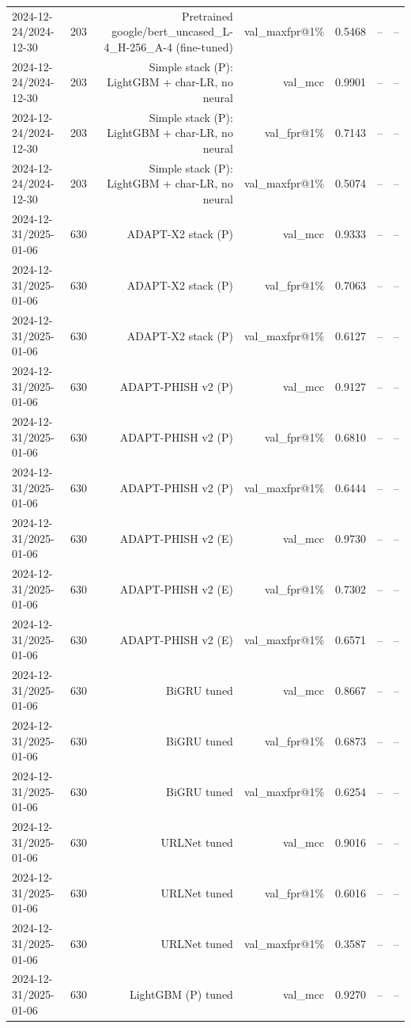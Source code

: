 \begin{table}[t]
\begin{tabular}{llrrrrr}
2024-12-24/2024-12-30 & 203 & Pretrained google/bert\_uncased\_L-4\_H-256\_A-4 (fine-tuned) & val\_maxfpr@1\% & 0.5468 & -- & -- \\
2024-12-24/2024-12-30 & 203 & Simple stack (P): LightGBM + char-LR, no neural & val\_mcc & 0.9901 & -- & -- \\
2024-12-24/2024-12-30 & 203 & Simple stack (P): LightGBM + char-LR, no neural & val\_fpr@1\% & 0.7143 & -- & -- \\
2024-12-24/2024-12-30 & 203 & Simple stack (P): LightGBM + char-LR, no neural & val\_maxfpr@1\% & 0.5074 & -- & -- \\
2024-12-31/2025-01-06 & 630 & ADAPT-X2 stack (P) & val\_mcc & 0.9333 & -- & -- \\
2024-12-31/2025-01-06 & 630 & ADAPT-X2 stack (P) & val\_fpr@1\% & 0.7063 & -- & -- \\
2024-12-31/2025-01-06 & 630 & ADAPT-X2 stack (P) & val\_maxfpr@1\% & 0.6127 & -- & -- \\
2024-12-31/2025-01-06 & 630 & ADAPT-PHISH v2 (P) & val\_mcc & 0.9127 & -- & -- \\
2024-12-31/2025-01-06 & 630 & ADAPT-PHISH v2 (P) & val\_fpr@1\% & 0.6810 & -- & -- \\
2024-12-31/2025-01-06 & 630 & ADAPT-PHISH v2 (P) & val\_maxfpr@1\% & 0.6444 & -- & -- \\
2024-12-31/2025-01-06 & 630 & ADAPT-PHISH v2 (E) & val\_mcc & 0.9730 & -- & -- \\
2024-12-31/2025-01-06 & 630 & ADAPT-PHISH v2 (E) & val\_fpr@1\% & 0.7302 & -- & -- \\
2024-12-31/2025-01-06 & 630 & ADAPT-PHISH v2 (E) & val\_maxfpr@1\% & 0.6571 & -- & -- \\
2024-12-31/2025-01-06 & 630 & BiGRU tuned & val\_mcc & 0.8667 & -- & -- \\
2024-12-31/2025-01-06 & 630 & BiGRU tuned & val\_fpr@1\% & 0.6873 & -- & -- \\
2024-12-31/2025-01-06 & 630 & BiGRU tuned & val\_maxfpr@1\% & 0.6254 & -- & -- \\
2024-12-31/2025-01-06 & 630 & URLNet tuned & val\_mcc & 0.9016 & -- & -- \\
2024-12-31/2025-01-06 & 630 & URLNet tuned & val\_fpr@1\% & 0.6016 & -- & -- \\
2024-12-31/2025-01-06 & 630 & URLNet tuned & val\_maxfpr@1\% & 0.3587 & -- & -- \\
2024-12-31/2025-01-06 & 630 & LightGBM (P) tuned & val\_mcc & 0.9270 & -- & -- \\

\end{tabular}
\end{table}
